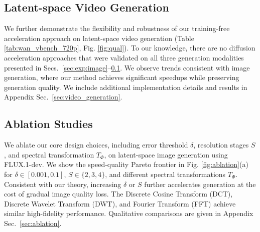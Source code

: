 

\vspace{-5pt}
\subsection{Latent-space Video Generation}
\label{sec:exp:video}

We further demonstrate the flexibility and robustness of our training-free acceleration approach on latent-space video generation (Table \ref{tab:wan_vbench_720p}, Fig. \ref{fig:qual}). To our knowledge, there are no diffusion acceleration approaches that were validated on all three generation modalities presented in Secs.~\ref{sec:exp:image}--\ref{sec:exp:video}. We observe trends consistent with image generation, where our method achieves significant speedups while preserving generation quality. We include additional implementation details and results in Appendix Sec.~\ref{sec:video_generation}.


\vspace{-5pt}
\subsection{Ablation Studies}
\label{sec:exp:ablations}

We ablate our core design choices, including error threshold $\delta$, resolution stages $S$, and spectral transformation $T_\Phi$, on latent-space image generation using FLUX.1-dev. We show the speed-quality Pareto frontier in Fig. \ref{fig:ablation}(a) for $\delta \in [0.001, 0.1]$, $S \in \{2, 3, 4\}$, and different spectral transformations $T_\Phi$. Consistent with our theory, increasing $\delta$ or $S$ further accelerates generation at the cost of gradual image quality loss. The Discrete Cosine Transform (DCT), Discrete Wavelet Transform (DWT), and Fourier Transform (FFT) achieve similar high-fidelity performance. Qualitative comparisons are given in Appendix Sec.~\ref{sec:ablation}.

